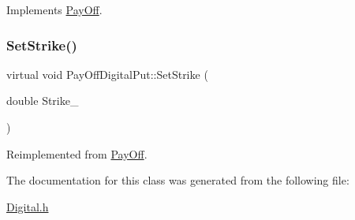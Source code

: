 Implements \hyperlink{classPayOff_a5ae17d82c233ef5568c8fb0539703000}{Pay\+Off}.

\hypertarget{classPayOffDigitalPut_aaf343c40b07b7405d192416ce23b00a8}{}\label{classPayOffDigitalPut_aaf343c40b07b7405d192416ce23b00a8} 
\subsubsection{\texorpdfstring{Set\+Strike()}{SetStrike()}}
{\footnotesize\ttfamily virtual void Pay\+Off\+Digital\+Put\+::\+Set\+Strike (\begin{DoxyParamCaption}\item[{double}]{Strike\+\_\+ }\end{DoxyParamCaption})\hspace{0.3cm}{\ttfamily [virtual]}}



Reimplemented from \hyperlink{classPayOff_a3fdefed95df90a057acfd697f5703e04}{Pay\+Off}.



The documentation for this class was generated from the following file\+:\begin{DoxyCompactItemize}
\item 
\hyperlink{Digital_8h}{Digital.\+h}\end{DoxyCompactItemize}
